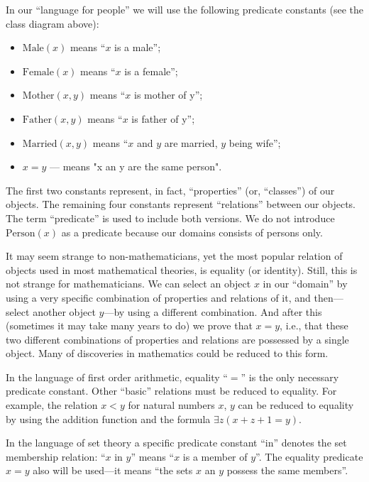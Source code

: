 \begin{ex}[]
In our ``language for people'' we will use the following predicate constants (see the class diagram above):
\begin{itemize}
    \item \(\mathrm{Male}(x)\) means ``\(x\) is a male'';
    \item \(\mathrm{Female}(x)\) means ``\(x\) is a female'';
    \item \(\mathrm{Mother}(x, y)\) means ``\(x\) is mother of y'';
    \item \(\mathrm{Father}(x, y)\) means ``\(x\) is father of y'';
    \item \(\mathrm{Married}(x, y)\) means ``\(x\) and \(y\) are married, \(y\) being wife'';
    \item \(x=y\) --- means "x an y are the same person".
\end{itemize}

The first two constants represent, in fact, ``properties'' (or, ``classes'') of our objects.
The remaining four constants represent ``relations'' between our objects.
The term ``predicate'' is used to include both versions.
We do not introduce \(\mathrm{Person}(x)\) as a predicate because our domains consists of persons only.
\end{ex}

\begin{ex}[]
It may seem strange to non-mathematicians, yet the most popular relation of objects used in most mathematical theories, is equality (or identity).
Still, this is not strange for mathematicians.
We can select an object \(x\) in our ``domain'' by using a very specific combination of properties and relations of it, and then---select another object \(y\)---by using a different combination.
And after this (sometimes it may take many years to do) we prove that \(x=y\), i.e., that these two different combinations of properties and relations are possessed by a single object.
Many of discoveries in mathematics could be reduced to this form.

In the language of first order arithmetic, equality ``\(=\)'' is the only necessary predicate constant.
Other ``basic'' relations must be reduced to equality.
For example, the relation \(x<y\) for natural numbers \(x\), \(y\) can be reduced to equality by using the addition function and the formula \(\exists z(x+z+1=y)\).
\end{ex}

\begin{ex}[]
In the language of set theory a specific predicate constant ``in'' denotes the set membership relation: ``\(x\) in \(y\)'' means ``\(x\) is a member of \(y\)''.
The equality predicate \(x=y\) also will be used---it means ``the sets \(x\) an \(y\) possess the same members''.
\end{ex}

